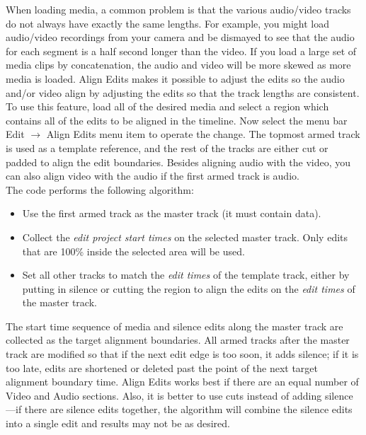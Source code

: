 When loading media, a common problem is that the various audio/video tracks do not always have exactly the same lengths. For example, you might load audio/video recordings from your camera and be dismayed to see that the audio for each segment is a half second longer than the video. If you load a large set of media clips by concatenation, the audio and video will be more skewed as more media is loaded. Align Edits makes it possible to adjust the edits so the audio and/or video align by adjusting 
the edits so that the track lengths are consistent. To use this feature, load all of the desired media and select a region which contains all of the edits to be aligned in the timeline. Now select the menu bar Edit $\rightarrow$ Align Edits menu item to operate the change. The topmost armed track is used as a template reference, and the rest of the tracks are either cut or padded to align the edit boundaries.  Besides aligning audio with the video, you can also align video with the audio if the first armed track is audio. \\
The code performs the following algorithm:
\begin{itemize}
    \item Use the first armed track as the master track (it must contain data).
    \item Collect the \textit{edit project start times} on the selected master track. Only edits that are 100\% inside the selected area will be used.
    \item Set all other tracks to match the \textit{edit times} of the template track, either by putting in silence or cutting the region to align the edits on the \textit{edit times} of the master track.
\end{itemize}
The start time sequence of media and silence edits along the master track are collected as the target 
alignment boundaries. All armed tracks after the master track are modified so that if the next edit edge 
is too soon, it adds silence; if it is too late, edits are shortened or deleted past the point of the next target
alignment boundary time.  Align Edits works best if there are an equal number of Video and Audio sections.  Also, it is better to use cuts instead of adding silence ---if there are silence edits together, the algorithm will combine the silence edits into a single edit and results may not be as desired.

